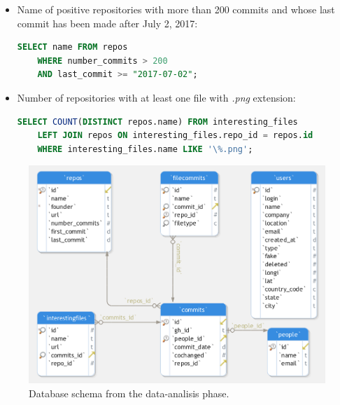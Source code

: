 \documentclass[a4paper, 12pt]{book}
\begin{document}
\begin{itemize}
    \item Name of positive repositories with more than 200 commits and whose last commit has been made after July 2, 2017:
    \begin{lstlisting}[language=SQL]
    SELECT name FROM repos
    WHERE number_commits > 200
    AND last_commit >= "2017-07-02"; \end{lstlisting}
    \item Number of repositories with at least one file with \textit{.png} extension:
    \begin{lstlisting}[language=SQL]
    SELECT COUNT(DISTINCT repos.name) FROM interesting_files
    LEFT JOIN repos ON interesting_files.repo_id = repos.id
    WHERE interesting_files.name LIKE '\%.png'; \end{lstlisting}
\end{itemize}

\begin{figure}
  \centering
  \includegraphics[width=15cm, keepaspectratio]{img/dbschema-generic}
  \caption{Database schema from the data-analisis phase.}
  \label{fig:dbschema}
\end{figure}
\cleardoublepage
\end{document}
